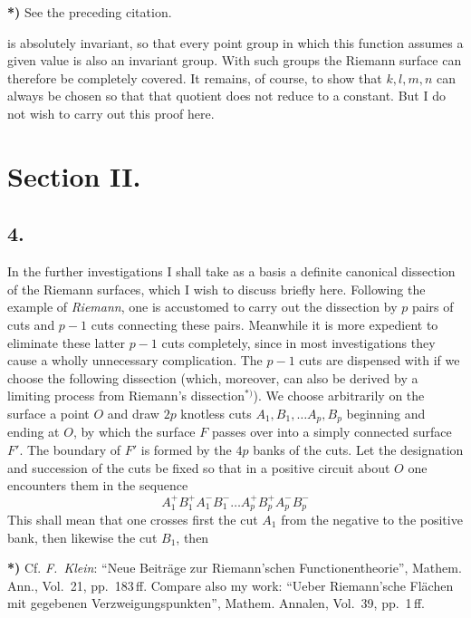 \documentclass{article}
\begin{document}
\textbf{*)} See the preceding citation.

is absolutely invariant, so that every point group in which this function assumes a given value is also an invariant group. With such groups the Riemann surface can therefore be completely covered. It remains, of course, to show that $k, l, m, n$ can always be chosen so that that quotient does not reduce to a constant. But I do not wish to carry out this proof here.

\section*{Section II.}

\subsection*{4.}

In the further investigations I shall take as a basis a definite canonical dissection of the Riemann surfaces, which I wish to discuss briefly here. Following the example of \emph{Riemann}, one is accustomed to carry out the dissection by $p$ pairs of cuts and $p-1$ cuts connecting these pairs. Meanwhile it is more expedient to eliminate these latter $p-1$ cuts completely, since in most investigations they cause a wholly unnecessary complication. The $p-1$ cuts are dispensed with if we choose the following dissection (which, moreover, can also be derived by a limiting process from Riemann's dissection${}^{*)}$). We choose arbitrarily on the surface a point $O$ and draw $2p$ knotless cuts $A_1, B_1, \dots A_p, B_p$ beginning and ending at $O$, by which the surface $F$ passes over into a simply connected surface $F'$. The boundary of $F'$ is formed by the $4p$ banks of the cuts. Let the designation and succession of the cuts be fixed so that in a positive circuit about $O$ one encounters them in the sequence
\[
A_1^+ B_1^+ A_1^- B_1^- \dots A_p^+ B_p^+ A_p^- B_p^-
\]
This shall mean that one crosses first the cut $A_1$ from the negative to the positive bank, then likewise the cut $B_1$, then


\textbf{*)} Cf. \emph{F.~Klein}: ``Neue Beiträge zur Riemann'schen Functionentheorie'', Mathem. Ann., Vol.~21, pp.~183\,ff. Compare also my work: ``Ueber Riemann'sche Flächen mit gegebenen Verzweigungspunkten'', Mathem. Annalen, Vol.~39, pp.~1\,ff.
\end{document}
